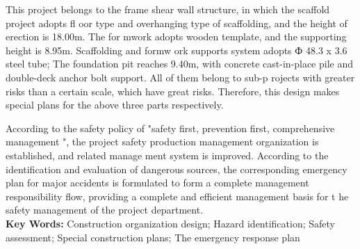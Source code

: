    This project belongs to the frame shear wall structure, in which the scaffold project adopts fl oor type and overhanging type of scaffolding, 
   and the height of erection is 18.00m. The for mwork adopts wooden template, and the supporting height is 8.95m. Scaffolding and formw ork 
   supports system adopts Ф 48.3 x 3.6 steel tube; The foundation pit reaches 9.40m, with concrete cast-in-place pile and double-deck anchor 
   bolt support. All of them belong to sub-p rojects with greater risks than a certain scale, which have great risks. Therefore, this design 
   makes special plans for the above three parts respectively.

   According to the safety policy of "safety first, prevention first, comprehensive management ", the project safety production management 
   organization is established, and related manage ment system is improved. According to the identification and evaluation of dangerous sources,
    the corresponding emergency plan for major accidents is formulated to form a complete management responsibility flow, providing a complete 
    and efficient management basis for t he safety management of the project department.
    \\

\textbf{ Key Words:} Construction organization design; Hazard identification; Safety assessment; Special construction plans; The emergency response plan
\pagestyle{fancy}




